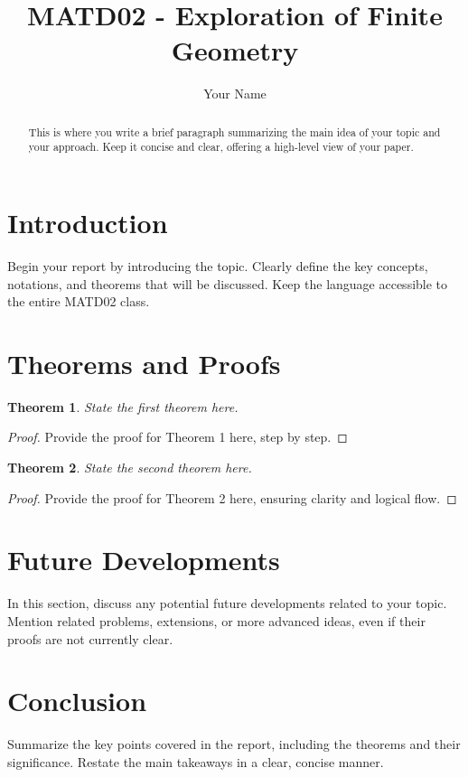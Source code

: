 \documentclass[12pt]{article}
\title{MATD02 - Exploration of Finite Geometry }
\author{Your Name}
\date{}
\newtheorem{theorem}{Theorem}
\begin{document}
    \maketitle

    \begin{abstract}
        This is where you write a brief paragraph summarizing the main idea of your topic and your approach. Keep it concise and clear, offering a high-level view of your paper.
    \end{abstract}


    \section{Introduction}
    Begin your report by introducing the topic. Clearly define the key concepts, notations, and theorems that will be discussed. Keep the language accessible to the entire MATD02 class.

    \section{Theorems and Proofs}

    \begin{theorem}
        State the first theorem here.
    \end{theorem}

    \begin{proof}
        Provide the proof for Theorem 1 here, step by step.
    \end{proof}

    \begin{theorem}
        State the second theorem here.
    \end{theorem}

    \begin{proof}
        Provide the proof for Theorem 2 here, ensuring clarity and logical flow.
    \end{proof}

    \section{Future Developments}
    In this section, discuss any potential future developments related to your topic. Mention related problems, extensions, or more advanced ideas, even if their proofs are not currently clear.

    \section{Conclusion}
    Summarize the key points covered in the report, including the theorems and their significance. Restate the main takeaways in a clear, concise manner.

    
    
\end{document}
